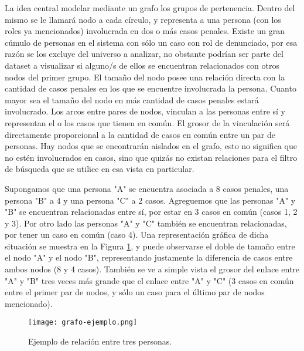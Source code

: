 La idea central modelar mediante un grafo los grupos de pertenencia. Dentro del mismo se le llamará nodo a cada círculo, y representa a una persona (con los roles ya mencionados) involucrada en dos o más casos penales. Existe un gran cúmulo de personas en el sistema con sólo un caso con rol de denunciado, por esa razón se los excluye del universo a analizar, no obstante podrían ser parte del dataset a visualizar si alguno/s de ellos se encuentran relacionados con otros nodos del primer grupo. El tamaño del nodo posee una relación directa con la cantidad de casos penales en los que se encuentre involucrada la persona. Cuanto mayor sea el tamaño del nodo en más cantidad de casos penales estará involucrado.
Los arcos entre pares de nodos, vinculan a las personas entre sí y representan el o los casos que tienen en común. El grosor de la vinculación será directamente proporcional a la cantidad de casos en común entre un par de personas. Hay nodos que se encontrarán aislados en el grafo, esto no significa que no estén involucrados en casos, sino que quizás no existan relaciones para el filtro de búsqueda que se utilice en esa vista en particular.


Supongamos que una persona "A" se encuentra asociada a 8 casos penales, una persona "B" a 4 y una persona "C" a 2 casos. Agreguemos que las personas "A" y "B" se encuentran relacionadas entre sí, por estar en 3 casos en común (casos 1, 2 y 3). Por otro lado las personas "A" y "C" también se encuentran relacionadas, por tener un caso en común (caso 4).  Una representación gráfica de dicha situación se muestra en la Figura \ref{fig:grafode2}, y puede observarse el doble de tamaño entre el nodo "A" y el nodo "B", representando justamente la diferencia de casos entre ambos nodos (8 y 4 casos). También se ve a simple vista el grosor del enlace entre "A" y "B" tres veces más grande que el enlace entre "A" y "C" (3 casos en común entre el primer par de nodos, y sólo un caso para el último par de nodos mencionado). 
\vspace{-15pt}
\begin{figure}
	\centering
	\texttt{[image: grafo-ejemplo.png]}
	\caption{Ejemplo de relación entre tres personas.} 
	\label{fig:grafode2}
\end{figure}
\vspace{-5pt}